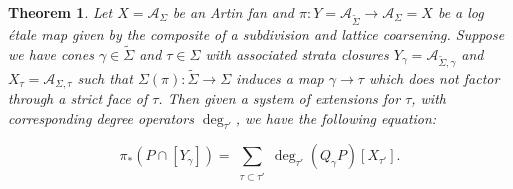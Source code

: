 \documentclass[12pt, oneside]{amsart}   	%
\newcounter{thm}
\newtheorem{theorem}[thm]{Theorem}
\numberwithin{equation}{section}
\numberwithin{thm}{section}
\numberwithin{figure}{section}
\begin{document}
\begin{theorem}\label{normalform}
Let $X = \mathcal{A}_{\Sigma}$ be an Artin fan and $\pi: Y = \mathcal{A}_{\widetilde{\Sigma}} \rightarrow \mathcal{A}_{\Sigma}= X$ be a log \'etale map given by the composite of a subdivision and lattice coarsening. Suppose we have cones $\gamma \in \widetilde{\Sigma}$ and $\tau \in \Sigma$ with associated strata closures $Y_{\gamma} = \mathcal{A}_{\widetilde{\Sigma},\gamma}$ and $X_{\tau} = \mathcal{A}_{\Sigma,\tau}$ such that $\Sigma(\pi):\widetilde{\Sigma}\rightarrow \Sigma$ induces a map $\gamma \rightarrow \tau$ which does not factor through a strict face of $\tau$. Then given a system of extensions for $\tau$, with corresponding degree operators $\deg_{\tau'}$, we have the following equation:

\begin{equation}
\pi_*(P\cap [Y_{\gamma}]) = \sum_{\substack{\tau\subset \tau'}} \deg_{\tau'}(Q_{\gamma}P)[X_{\tau'}].
\end{equation}
\end{theorem}
\end{document}
